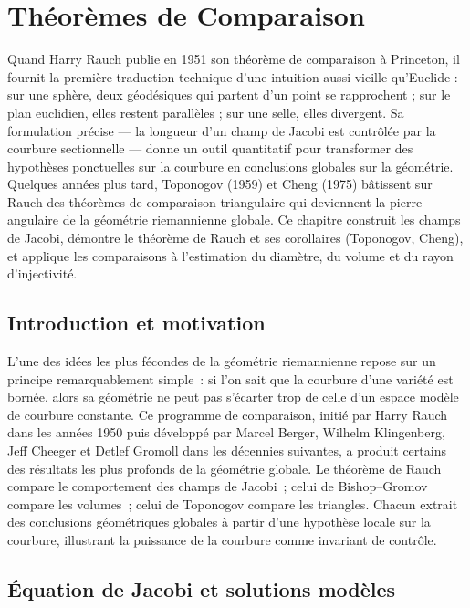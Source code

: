 \chapter{Th\'eor\`emes de Comparaison}
\label{ch:comparaison}

Quand Harry Rauch publie en 1951 son théorème de comparaison à Princeton, il fournit la première traduction technique d'une intuition aussi vieille qu'Euclide : sur une sphère, deux géodésiques qui partent d'un point se rapprochent ; sur le plan euclidien, elles restent parallèles ; sur une selle, elles divergent. Sa formulation précise --- la longueur d'un champ de Jacobi est contrôlée par la courbure sectionnelle --- donne un outil quantitatif pour transformer des hypothèses ponctuelles sur la courbure en conclusions globales sur la géométrie. Quelques années plus tard, Toponogov (1959) et Cheng (1975) bâtissent sur Rauch des théorèmes de comparaison triangulaire qui deviennent la pierre angulaire de la géométrie riemannienne globale. Ce chapitre construit les champs de Jacobi, démontre le théorème de Rauch et ses corollaires (Toponogov, Cheng), et applique les comparaisons à l'estimation du diamètre, du volume et du rayon d'injectivité.

\section{Introduction et motivation}

L'une des id\'ees les plus f\'econdes de la g\'eom\'etrie riemannienne repose sur un principe remarquablement simple~: si l'on sait que la courbure d'une vari\'et\'e est born\'ee, alors sa g\'eom\'etrie ne peut pas s'\'ecarter trop de celle d'un espace \og mod\`ele \fg{} de courbure constante. Ce programme de comparaison, initi\'e par Harry Rauch dans les ann\'ees 1950 puis d\'evelopp\'e par Marcel Berger, Wilhelm Klingenberg, Jeff Cheeger et Detlef Gromoll dans les d\'ecennies suivantes, a produit certains des r\'esultats les plus profonds de la g\'eom\'etrie globale. Le th\'eor\`eme de Rauch compare le comportement des champs de Jacobi~; celui de Bishop--Gromov compare les volumes~; celui de Toponogov compare les triangles. Chacun extrait des conclusions g\'eom\'etriques globales \`a partir d'une hypoth\`ese locale sur la courbure, illustrant la puissance de la courbure comme invariant de contr\^ole.

\section{\'Equation de Jacobi et solutions mod\`eles}

